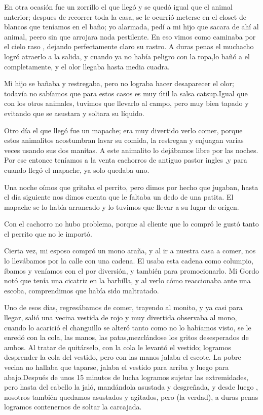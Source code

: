 \documentclass[letterpaper, 12pt]{book}
\begin{document}
En otra ocasión fue un zorrillo el que llegó y se quedó igual que el animal anterior; despues de recorrer toda la casa, se le ocurrió meterse en el closet de blancos que teníamos en el baño; yo alarmada, pedí a mi hijo que sacara de ahí al animal, peero sin que arrojara nada pestilente. En eso vimos como caminaba por el cielo raso , dejando perfectamente claro su rastro. A duras penas el muchacho logró atraerlo a la salida, y cuando ya no había peligro con la ropa,lo bañó a el completamente, y el olor llegaba hasta media cuadra.

Mi hijo se bañaba y restregaba, pero no lograba hacer desaparecer el olor; todavía no sabíamos que para estos casos es muy útil la salsa catsup.Igual que con los otros animales, tuvimos que llevarlo al campo, pero muy bien tapado y evitando que se asustara y soltara su líquido. 

Otro día el que llegó fue un mapache; era muy divertido verlo comer, porque estos animalitos acostumbran lavar su comida, la restregan y enjuagan varias veces usando sus dos manitas. A este animalito lo dejábamos libre por las noches. Por ese entonce teníamos a la venta cachorros de antiguo pastor ingles ,y para cuando llegó el mapache, ya solo quedaba uno.

Una noche oímos que gritaba el perrito, pero dimos por hecho que jugaban, hasta el día siguiente nos dimos cuenta que le faltaba un dedo de una patita. El mapache se lo había arrancado y lo tuvimos que llevar a su lugar de origen.

Con el cachorro no hubo problema, porque al cliente que lo compró le gustó tanto el perrito que no le importó.

Cierta vez, mi esposo compró un mono araña, y al ir a nuestra casa a comer, nos lo llevábamos por la calle con una cadena. El usaba esta cadena como columpio, íbamos y veníamos con el por diversión, y también para promocionarlo. Mi Gordo notó que tenía una cicatriz en la barbilla, y al verlo cómo reaccionaba ante una escoba, comprendimos que había sido maltratado.

Uno de esos días, regresábamos de comer, trayendo al monito, y ya casi para llegar, salió una vecina vestida de rojo y muy divertida observaba al mono, cuando lo acarició el changuillo se alteró tanto como no lo habíamos visto, se le enredó con la cola, las manos, las patas,mezclándose los gritos desesperados de ambos. Al tratar de quitárselo, con la cola le levantó el vestido; logramos desprender la cola del vestido, pero con las manos jalaba el escote. La pobre vecina no hallaba que taparse, jalaba el vestido para arriba y luego para abajo.Después de unos 15 minutos de lucha logramos sujetar las extremidades, pero hasta del cabello la jaló, mandándola asustada y desgreñada, y desde luego , nosotros también quedamos asustados y agitados, pero (la verdad), a duras penas logramos contenernos de soltar la carcajada.
\end{document}
